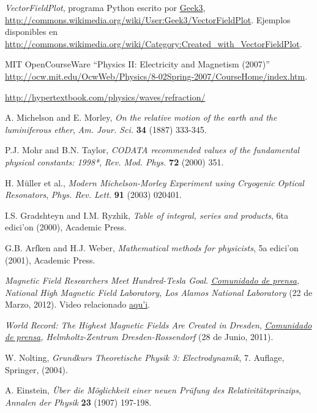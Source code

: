 \begin{thebibliography}{99}
 \textit{VectorFieldPlot}, programa Python escrito por \href{http://commons.wikimedia.org/wiki/User:Geek3}{Geek3}, \url{http://commons.wikimedia.org/wiki/User:Geek3/VectorFieldPlot}. Ejemplos disponibles en \url{http://commons.wikimedia.org/wiki/Category:Created_with_VectorFieldPlot}.


 MIT OpenCourseWare  ``Physics II: Electricity and Magnetism (2007)'' \url{http://ocw.mit.edu/OcwWeb/Physics/8-02Spring-2007/CourseHome/index.htm}.

\url{http://hypertextbook.com/physics/waves/refraction/}

 A. Michelson and E. Morley, {\it On the relative motion of the earth and the luminiferous ether}, {\sl Am. Jour. Sci.} {\bf 34} (1887) 333-345.

 P.J. Mohr and B.N. Taylor, {\it CODATA recommended values of the fundamental physical constants: 1998*}, {\sl Rev. Mod. Phys.} {\bf 72}
(2000) 351.

 H. M\"uller et al., {\it Modern Michelson-Morley
Experiment using Cryogenic Optical Resonators}, {\sl Phys. Rev. Lett.} {\bf 91} (2003) 020401.

 I.S. Gradshteyn and I.M. Ryzhik, {\it Table of integral, series and products}, 6ta edici'on (2000), Academic Press.

 G.B. Arfken and H.J. Weber, {\it Mathematical methods for physicists}, 5a  edici'on (2001), Academic Press.

 {\it Magnetic Field Researchers Meet Hundred-Tesla Goal}. {\sl \href{http://www.magnet.fsu.edu/mediacenter/news/pressreleases/2012/100tshot.html}{Comunidado de prensa}, National High Magnetic Field Laboratory, Los Alamos National Laboratory} (22 de Marzo, 2012). Video relacionado \href{http://youtu.be/N0R8dyyXtTo}{aqu'i}.

 {\it World Record: The Highest Magnetic Fields Are Created in Dresden}, {\sl \href{http://www.hzdr.de/db/Cms?pNid=99&pOid=33768}{Comunidado de prensa}, Helmholtz-Zentrum Dresden-Rossendorf} (28 de Junio, 2011). 

 W. Nolting, {\it Grundkurs Theoretische Physik 3: Electrodynamik}, 7. Auflage, Springer, (2004).

 A. Einstein, {\it \"Uber die M\"oglichkeit einer neuen Pr\"ufung des Relativit\"atsprinzips}, {\sl Annalen der Physik} {\bf 23} (1907) 197-198.


\end{thebibliography}
